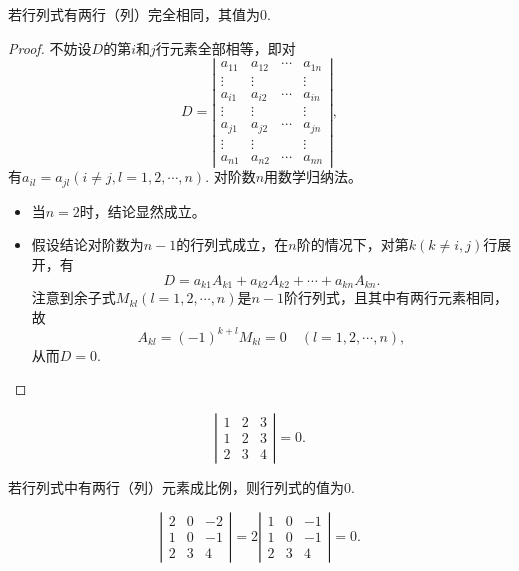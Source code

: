 \documentclass[10pt,a4paper%
tablecaptionabove]{article}
\begin{document}
\begin{CJK}{UTF8}{gkai}
  \begin{xingzhi}
    若行列式有两行（列）完全相同，其值为$0$.
  \end{xingzhi}
  \begin{proof}
    不妨设$D$的第$i$和$j$行元素全部相等，即对
    $$
    D = \left|
      \begin{array}{cccc}
        a_{11}  &  a_{12} & \cdots & a_{1n} \\
        \vdots & \vdots &  & \vdots\\  
        a_{i1}  &  a_{i2} & \cdots & a_{in} \\
        \vdots & \vdots &  & \vdots\\  
        a_{j1}  &  a_{j2} & \cdots & a_{jn} \\
        \vdots & \vdots &  & \vdots\\  
        a_{n1}  &  a_{n2} & \cdots & a_{nn} 
      \end{array}
    \right|,
    $$
    有$a_{il}=a_{jl}(i\ne j, l=1,2,\cdots,n)$.
    对阶数$n$用数学归纳法。
    \begin{itemize}
    \item 当$n=2$时，结论显然成立。
    \item 假设结论对阶数为$n-1$的行列式成立，在$n$阶的情况下，对第$k(k\ne i, j)$行展开，有
      $$
      D = a_{k1} A_{k1} + a_{k2} A_{k2} + \cdots + a_{kn} A_{kn}. 
      $$ 
      注意到余子式$M_{kl}(l=1,2,\cdots,n)$是$n-1$阶行列式，且其中有两行元素相同，故
      $$
      A_{kl} = (-1)^{k+l} M_{kl} = 0\quad (l=1,2,\cdots,n),
      $$
      从而$D=0$.
    \end{itemize}
  \end{proof}
  \begin{li}
    $$
    \left|
      \begin{array}{ccc}
        1 & 2 & 3\\
        1 & 2 & 3\\
        2 & 3 & 4
      \end{array}
    \right| = 0.
    $$
  \end{li}

  \begin{tuilun}
    若行列式中有两行（列）元素成比例，则行列式的值为$0$.
  \end{tuilun}
  \begin{li}
    $$
    \left|
      \begin{array}{ccc}
        2 & 0 & -2\\
        1 & 0 & -1\\
        2 & 3 & 4
      \end{array}
    \right| =2 \left|
      \begin{array}{ccc}
        1 & 0 & -1\\
        1 & 0 & -1\\
        2 & 3 & 4
      \end{array}
    \right| = 0.
    $$
  \end{li}


\end{CJK}
\end{document}
